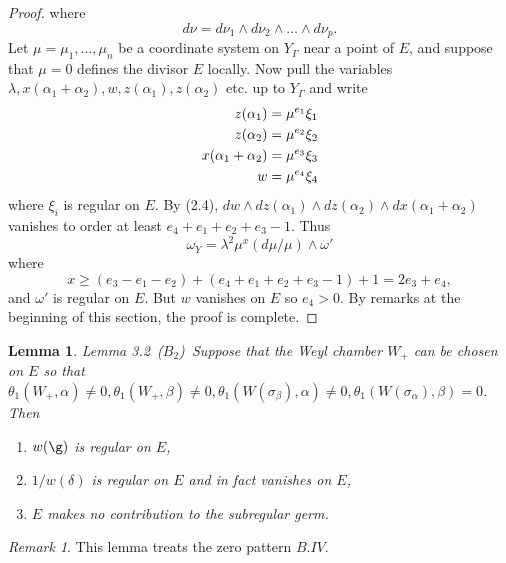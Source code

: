 \documentclass{memo-l}
\newtheorem{lemma}[theorem]{Lemma}
\theoremstyle{definition}
\theoremstyle{remark}
\newtheorem*{remark*}{Remark} %
\numberwithin{section}{chapter}
\numberwithin{equation}{chapter}
\begin{document}
\begin{proof}
\noindent
where 
$$
d{\nu} = d{\nu}_{1}\wedge d{\nu}_{2}\wedge \ldots \wedge d{\nu}_{p} .
$$
Let ${\mu} = {\mu}_{1},\ldots , {\mu}_{n}$ be a coordinate system on 
$Y_{{\Gamma}}$ near a point of $E$, and suppose that ${\mu} = 0$ defines the 
divisor $E$ locally. 
 Now pull the variables ${\lambda}, x({\alpha}_{1}+{\alpha}_{2}), w, 
z({\alpha}_{1}), z({\alpha}_{2})$ etc. 
up to $Y_{{\Gamma}}$ and write
$$
\aligned
z({\alpha}_{1}) &= {\mu}^{e_1} {\xi}_{1}\\
z({\alpha}_{2}) &= {\mu}^{e_2} {\xi}_{2} \\
x({\alpha}_{1}+{\alpha}_{2}) &= {\mu}^{e_3} {\xi}_{3} \\
w &= {\mu}^{e_4} {\xi}_{4}
\endaligned
$$
where ${\xi}_{i}$ is regular on $E$. 
 By (2.4), $dw\wedge dz({\alpha}_{1})\wedge dz({\alpha}_{2})\wedge 
dx({\alpha}_{1}+{\alpha}_{2})$ vanishes to order at least $e_{4}+e_{1}+
e_{2}+e_{3}-1$. 
 Thus 
$$
{\omega}_{Y} = {\lambda}^{2}{\mu}^{x}(d{\mu}/{\mu})\wedge {\omega}'
$$
where 
$$
x \ge  (e_{3}-e_{1}-e_{2}) + (e_{4}+e_{1}+e_{2}+e_{3}-1) + 1 
= 2e_{3}+e_{4} ,
$$ 
and ${\omega}'$ is regular on $E$. 
 But $w$ vanishes on $E$ so $e_{4} > 0$. 
 By remarks at the beginning of this section, the proof is complete.
\end{proof}
{\medskip}

\begin{lemma}{Lemma 3.2}\  ($B_{2}$)\ Suppose that the Weyl chamber $W_{+}$ can be 
chosen on $E$ so that ${\theta}_{1}(W_{+},{\alpha})\ne 0, {\theta}_{1}(W_{+},
{\beta})\ne 0, {\theta}_{1}(W({\sigma}_{\beta}),{\alpha})\ne 0, 
{\theta}_{1}(W({\sigma}_{\alpha}),{\beta}) = 0$. 
 Then

\begin{enumerate}[label=\alph*)]
\item $w({\g})$ is regular on $E$,
\item $1/w({\delta})$ is regular on $E$ and in fact vanishes on $E$,
\item $E$ makes no contribution to the subregular germ.
\end{enumerate}
\end{lemma}

\begin{remark*} This lemma treats the zero pattern $B.IV$.
\end{remark*}

\medskip
\end{document}
